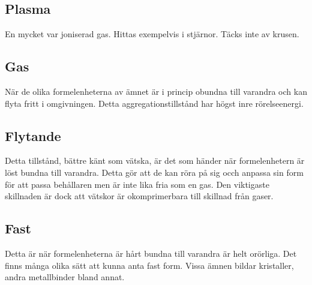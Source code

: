 \subsection*{Plasma}
En mycket var joniserad gas. Hittas exempelvis i stjärnor. Täcks inte av krusen.
\subsection*{Gas}
När de olika formelenheterna av ämnet är i princip obundna till varandra och kan flyta fritt i omgivningen. Detta aggregationstillstånd har högst inre rörelseenergi.
\subsection*{Flytande}
Detta tillstånd, bättre känt som vätska, är det som händer när formelenhetern är löst bundna till varandra. Detta gör att de kan röra på sig occh anpassa sin form för att passa behållaren men är inte lika fria som en gas. Den viktigaste skillnaden är dock att vätskor är okomprimerbara till skillnad från gaser.
\subsection*{Fast}
Detta är när formelenheterna är hårt bundna till varandra är helt orörliga. Det finns många olika sätt att kunna anta fast form. Vissa ämnen bildar kristaller, andra metallbinder bland annat.